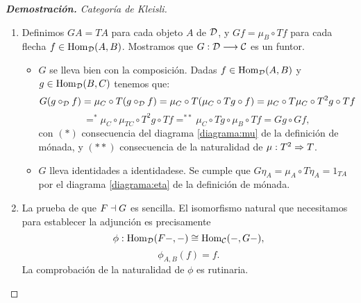 \begin{proof}[\textbf{Demostración. } Categoría de Kleisli]
\begin{enumerate}
  \item Definimos $GA = TA$ para cada objeto $A$ de $\mathcal{D}$,
    y $Gf = \mu_B \circ Tf$ para cada flecha $f \in \operatorname{Hom}_{\mathcal{D}}(A, B)$.
    Mostramos que $G: \mathcal{D}\longrightarrow \mathcal{C}$ es un funtor.
    \begin{itemize}
    \item $G$ se lleva bien con la composición. Dadas $f \in \operatorname{Hom}_{\mathcal{D}}(A, B)$
      y $g \in \operatorname{Hom}_{\mathcal{D}}(B, C)$ tenemos que:
      $$G(g \circ_{\mathcal{D}} f) = \mu_C \circ T(g \circ_{\mathcal{D}} f)
      = \mu_C \circ T(\mu_C \circ Tg \circ f)
      = \mu_C \circ T\mu_C \circ T^2g \circ Tf$$
      $$=^* \mu_C \circ \mu_{TC} \circ T^2g \circ Tf
      =^{**} \mu_C \circ Tg \circ \mu_B \circ Tf
      = Gg \circ Gf,$$
      con $(*)$ consecuencia del diagrama \eqref{diagrama:mu}
      de la definición de mónada, y $(**)$ consecuencia de la
      naturalidad de $\mu : T^2\Rightarrow T$.
    \item $G$ lleva identidades a identidadese. Se cumple que
      $G\eta_A = \mu_A \circ T\eta_A = 1_{TA}$
      por el diagrama \eqref{diagrama:eta} de la definición de mónada.
    \end{itemize}
  \item La prueba de que $F \dashv G$ es sencilla.
    El isomorfismo natural que necesitamos para establecer la
    adjunción es precisamente
    $$\phi : \operatorname{Hom}_{\mathcal{D}}(F-, -) \cong \operatorname{Hom}_{\mathcal{C}}(-, G-),$$
    $$\phi_{A, B}(f) = f.$$
    La comprobación de la naturalidad de $\phi$ es rutinaria.
  \end{enumerate}
\end{proof}
